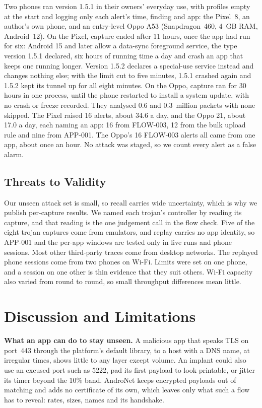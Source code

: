 \documentclass[runningheads]{llncs}
\begin{document}
Two phones ran version 1.5.1 in their owners' everyday use, with profiles empty at the start and logging only each alert's time, finding and app: the Pixel~8, an author's own phone, and an entry-level Oppo A53 (Snapdragon~460, 4~GB RAM, Android~12). On the Pixel, capture ended after 11 hours, once the app had run for six: Android 15 and later allow a data-sync foreground service, the type version 1.5.1 declared, six hours of running time a day and crash an app that keeps one running longer. Version 1.5.2 declares a special-use service instead and changes nothing else; with the limit cut to five minutes, 1.5.1 crashed again and 1.5.2 kept its tunnel up for all eight minutes. On the Oppo, capture ran for 30 hours in one process, until the phone restarted to install a system update, with no crash or freeze recorded. They analysed 0.6 and 0.3~million packets with none skipped. The Pixel raised 16 alerts, about 34.6 a day, and the Oppo 21, about 17.0 a day, each naming an app: 16 from FLOW-003, 12 from the bulk upload rule and nine from APP-001. The Oppo's 16 FLOW-003 alerts all came from one app, about once an hour. No attack was staged, so we count every alert as a false alarm.

\subsection{Threats to Validity}

Our unseen attack set is small, so recall carries wide uncertainty, which is why we publish per-capture results. We named each trojan's controller by reading its capture, and that reading is the one judgement call in the flow check. Five of the eight trojan captures come from emulators, and replay carries no app identity, so APP-001 and the per-app windows are tested only in live runs and phone sessions. Most other third-party traces come from desktop networks. The replayed phone sessions come from two phones on Wi-Fi. Limits were set on one phone, and a session on one other is thin evidence that they suit others. Wi-Fi capacity also varied from round to round, so small throughput differences mean little.

\section{Discussion and Limitations}\label{sec:discussion}

\textbf{What an app can do to stay unseen.} A malicious app that speaks TLS on port~443 through the platform's default library, to a host with a DNS name, at irregular times, shows little to any layer except volume. An implant could also use an excused port such as 5222, pad its first payload to look printable, or jitter its timer beyond the 10\% band. AndroNet keeps encrypted payloads out of matching and adds no certificate of its own, which leaves only what such a flow has to reveal: rates, sizes, names and its handshake.
\end{document}
